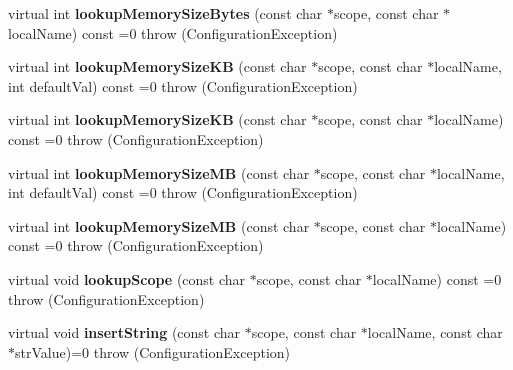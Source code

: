 \begin{DoxyCompactItemize}
\item 
\hypertarget{classCONFIG4CPP__NAMESPACE_1_1Configuration_ae37820eea8f3a35858f37876fa1ee921}{virtual int {\bfseries lookup\-Memory\-Size\-Bytes} (const char $\ast$scope, const char $\ast$local\-Name) const =0  throw (\-Configuration\-Exception)}\label{classCONFIG4CPP__NAMESPACE_1_1Configuration_ae37820eea8f3a35858f37876fa1ee921}

\item 
\hypertarget{classCONFIG4CPP__NAMESPACE_1_1Configuration_a60223b88f9f8ec41d1551403ba3ea192}{virtual int {\bfseries lookup\-Memory\-Size\-K\-B} (const char $\ast$scope, const char $\ast$local\-Name, int default\-Val) const =0  throw (\-Configuration\-Exception)}\label{classCONFIG4CPP__NAMESPACE_1_1Configuration_a60223b88f9f8ec41d1551403ba3ea192}

\item 
\hypertarget{classCONFIG4CPP__NAMESPACE_1_1Configuration_a44dd9f98cff623000df1e6eca7a92f4c}{virtual int {\bfseries lookup\-Memory\-Size\-K\-B} (const char $\ast$scope, const char $\ast$local\-Name) const =0  throw (\-Configuration\-Exception)}\label{classCONFIG4CPP__NAMESPACE_1_1Configuration_a44dd9f98cff623000df1e6eca7a92f4c}

\item 
\hypertarget{classCONFIG4CPP__NAMESPACE_1_1Configuration_adbfc936338d4c86e7c2ce9d1efb38ac3}{virtual int {\bfseries lookup\-Memory\-Size\-M\-B} (const char $\ast$scope, const char $\ast$local\-Name, int default\-Val) const =0  throw (\-Configuration\-Exception)}\label{classCONFIG4CPP__NAMESPACE_1_1Configuration_adbfc936338d4c86e7c2ce9d1efb38ac3}

\item 
\hypertarget{classCONFIG4CPP__NAMESPACE_1_1Configuration_af4c75331ada2a8ea767759e598dc4813}{virtual int {\bfseries lookup\-Memory\-Size\-M\-B} (const char $\ast$scope, const char $\ast$local\-Name) const =0  throw (\-Configuration\-Exception)}\label{classCONFIG4CPP__NAMESPACE_1_1Configuration_af4c75331ada2a8ea767759e598dc4813}

\item 
\hypertarget{classCONFIG4CPP__NAMESPACE_1_1Configuration_a6acec433039e028637a396dacbabf06b}{virtual void {\bfseries lookup\-Scope} (const char $\ast$scope, const char $\ast$local\-Name) const =0  throw (\-Configuration\-Exception)}\label{classCONFIG4CPP__NAMESPACE_1_1Configuration_a6acec433039e028637a396dacbabf06b}

\item 
\hypertarget{classCONFIG4CPP__NAMESPACE_1_1Configuration_ab7050a889854c6925338ff9b6b751e82}{virtual void {\bfseries insert\-String} (const char $\ast$scope, const char $\ast$local\-Name, const char $\ast$str\-Value)=0  throw (\-Configuration\-Exception)}\label{classCONFIG4CPP__NAMESPACE_1_1Configuration_ab7050a889854c6925338ff9b6b751e82}


\end{DoxyCompactItemize}
